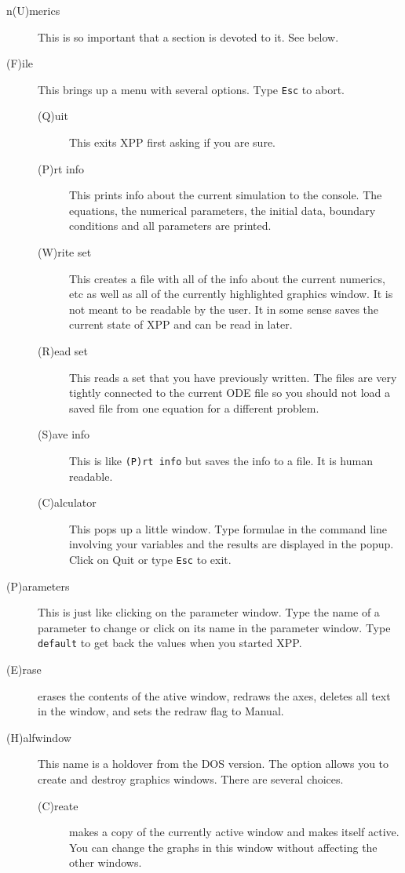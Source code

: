 \begin{description}
\item[n(U)merics] This is so important that a section is devoted to
it. See below.

\item[(F)ile] 
This brings up a menu with several options. Type {\tt Esc} to abort.
\begin{description}
\item[(Q)uit]  This exits XPP first asking if you are sure.
\item[(P)rt info] This prints info about the current simulation to the
console. The equations, the numerical parameters, the initial data,
boundary conditions and all parameters are printed.
\item[(W)rite set] This creates a file with all of the info about the
current numerics, etc as well as all of the currently highlighted
graphics window.  It is not meant to be readable by the user. It in
some sense saves the current state of XPP and can be read in later.
\item[(R)ead set]  This reads a set that you have previously written.
 The files are very tightly connected
 to the current ODE file so you should not load a saved file from one equation 
for a different problem.
\item[(S)ave info] This is like {\tt (P)rt info} but saves the info to
a file.  It is human readable.
\item[(C)alculator] This pops up a little window.  Type formulae in the command 
line involving your variables and the results are displayed in the popup.  Click
 on Quit or type {\tt Esc} to exit.
\end{description}
\item[(P)arameters]  This is just like clicking on the parameter
window.  Type the name
 of a parameter to change or click on its name in the parameter window.  Type 
{\tt default} to get back the values when you started XPP.  
\item[(E)rase] erases the contents of the ative window, redraws the
axes, 
deletes all 
text in the window, and sets the redraw flag to Manual.
\item[(H)alfwindow] This name is a holdover from the DOS version.  The option allows
 you to create and destroy graphics windows. There are several
choices.
\begin{description}  
\item[(C)reate] makes a copy of the currently active window and makes itself active.
  You can change the graphs in this window without affecting the other windows. 


\end{description}
\end{description}
